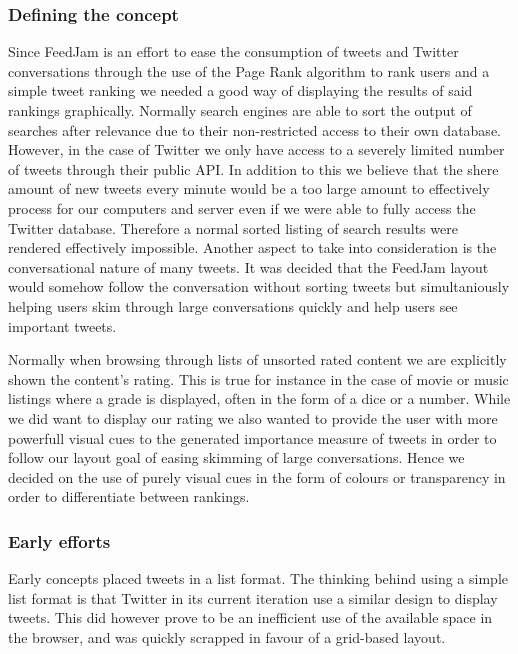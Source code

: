 \subsubsection{Defining the concept}
Since FeedJam is an effort to ease the consumption of tweets and Twitter conversations through the use of the Page Rank algorithm to rank users and a simple tweet ranking we needed a good way of displaying the results of said rankings graphically. Normally search engines are able to sort the output of searches after relevance due to their non-restricted access to their own database. However, in the case of Twitter we only have access to a severely limited number of tweets through their public API. In addition to this we believe that the shere amount of new tweets every minute would be a too large amount to effectively process for our computers and server even if we were able to fully access the Twitter database. Therefore a normal sorted listing of search results were rendered effectively impossible. Another aspect to take into consideration is the conversational nature of many tweets. It was decided that the FeedJam layout would somehow follow the conversation without sorting tweets but simultaniously helping users skim through large conversations quickly and help users see important tweets.

Normally when browsing through lists of unsorted rated content we are explicitly shown the content's rating. This is true for instance in the case of movie or music listings where a grade is displayed, often in the form of a dice or a number. While we did want to display our rating we also wanted to provide the user with more powerfull visual cues to the generated importance measure of tweets in order to follow our layout goal of easing skimming of large conversations. Hence we decided on the use of purely visual cues in the form of colours or transparency in order to differentiate between rankings.

\subsubsection{Early efforts}
Early concepts placed tweets in a list format. The thinking behind using a simple list format is that Twitter in its current iteration use a similar design to display tweets. This did however prove to be an inefficient use of the available space in the browser, and was quickly scrapped in favour of a grid-based layout.

